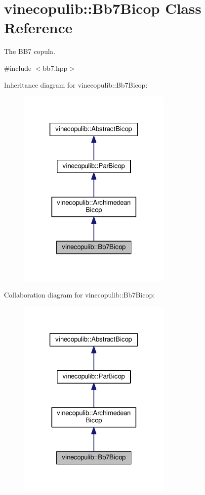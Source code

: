 \hypertarget{classvinecopulib_1_1_bb7_bicop}{}\section{vinecopulib\+:\+:Bb7\+Bicop Class Reference}
\label{classvinecopulib_1_1_bb7_bicop}


The B\+B7 copula.  




{\ttfamily \#include $<$bb7.\+hpp$>$}



Inheritance diagram for vinecopulib\+:\+:Bb7\+Bicop\+:\nopagebreak
\begin{figure}[H]
\begin{center}
\leavevmode
\includegraphics[width=213pt]{classvinecopulib_1_1_bb7_bicop__inherit__graph}
\end{center}
\end{figure}


Collaboration diagram for vinecopulib\+:\+:Bb7\+Bicop\+:\nopagebreak
\begin{figure}[H]
\begin{center}
\leavevmode
\includegraphics[width=213pt]{classvinecopulib_1_1_bb7_bicop__coll__graph}
\end{center}
\end{figure}
